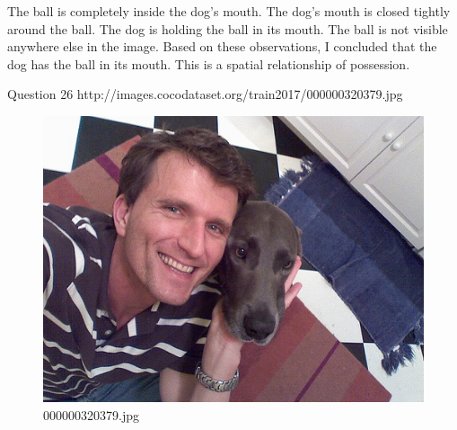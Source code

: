 \begin{enumerate}
        The ball is completely inside the dog's mouth.
        The dog's mouth is closed tightly around the ball.
        The dog is holding the ball in its mouth.
        The ball is not visible anywhere else in the image.
        Based on these observations, I concluded that the dog has the ball in its mouth. This is a spatial relationship of possession.
    \end{enumerate}

    Question 26 http://images.cocodataset.org/train2017/000000320379.jpg
    \begin{figure}[h]
        \centering
        \includegraphics[width=0.8\linewidth]{../image set/easy/000000320379.jpg}
        \caption{000000320379.jpg}
    \end{figure}
